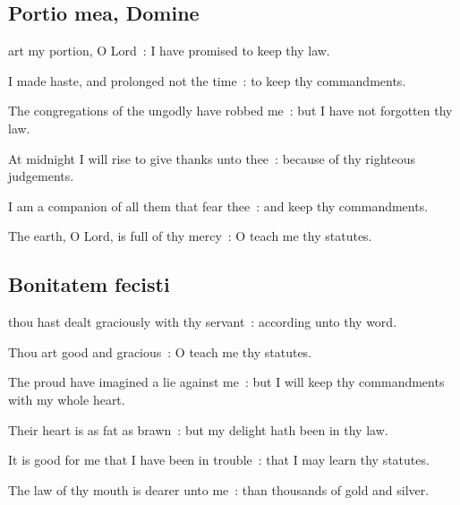 \subsection{Portio mea, Domine}


 art my portion, O Lord~: I have promised to keep thy law.\par
{}
I made haste, and prolonged not the time~: to keep thy commandments.\par
{}The congregations of the ungodly have robbed me~: but I have not forgotten thy law.\par
{}At midnight I will rise to give thanks unto thee~: because of thy righteous judgements.\par
{}I am a companion of all them that fear thee~: and keep thy commandments.\par
{}The earth, O Lord, is full of thy mercy~: O teach me thy statutes.\par

\subsection{Bonitatem fecisti}


 thou hast dealt graciously with thy servant~: according unto thy word.\par
{}
Thou art good and gracious~: O teach me thy statutes.\par
{}The proud have imagined a lie against me~: but I will keep thy commandments with my whole heart.\par
{}Their heart is as fat as brawn~: but my delight hath been in thy law.\par
{}It is good for me that I have been in trouble~: that I may learn thy statutes.\par
{}The law of thy mouth is dearer unto me~: than thousands of gold and silver.\par



